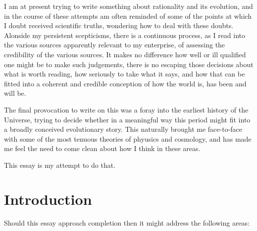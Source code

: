 \documentclass[10pt,titlepage]{book}
\begin{document}
I am at present trying to write something about rationality and its evolution, and in the course of these attempts am often reminded of some of the points at which I doubt received scientific truths, wondering how to deal with these doubts.
Alonside my persistent scepticisms, there is a continuous process, as I read into the various sources apparently relevant to my enterprise, of assessing the credibility of the various sources.
It makes no difference how well or ill qualified one might be to make such judgements, there is no escaping those decisions about what is worth reading, how seriously to take what it says, and how that can be fitted into a coherent and credible conception of how the world is, has been and will be.

The final provocation to write on this was a foray into the earliest history of the Universe, trying to decide whether in a meaningful way this period might fit into a broadly conceived evolutionary story.
This naturally brought me face-to-face with some of the most tenuous theories of phyusics and cosmology, and has made me feel the need to come clean about how I think in these areas.

This essay is my attempt to do that.

\chapter{Introduction}

Should this essay approach completion then it might address the following areas:
\end{document}
